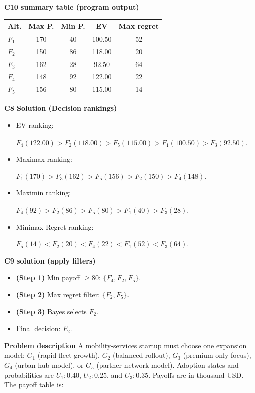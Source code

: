 \begin{ExamProblems}
		\vspace{0.25cm}
		
		\textbf{C10 summary table (program output)}\par
		\begin{center}
			\begin{tabular}{l c c c c}
				\hline
				Alt. & Max P. & Min P. & EV & Max regret \\
				\hline
				$F_1$ & 170 & 40 & 100.50 & 52 \\
				$F_2$ & 150 & 86 & 118.00 & 20 \\
				$F_3$ & 162 & 28 & 92.50 & 64 \\
				$F_4$ & 148 & 92 & 122.00 & 22 \\
				$F_5$ & 156 & 80 & 115.00 & 14 \\
				\hline
			\end{tabular}
		\end{center}
		
		\textbf{C8 Solution (Decision rankings)}\par
		\begin{itemize}
			\item EV ranking: \par $F_4(122.00)>F_2(118.00)>F_5(115.00)>F_1(100.50)>F_3(92.50)$.
			\item Maximax ranking:\par $F_1(170)>F_3(162)>F_5(156)>F_2(150)>F_4(148)$.
			\item Maximin ranking: \par $F_4(92)>F_2(86)>F_5(80)>F_1(40)>F_3(28)$.
			\item Minimax Regret ranking:\par $F_5(14)<F_2(20)<F_4(22)<F_1(52)<F_3(64)$.
		\end{itemize}
		
		\textbf{C9 solution (apply filters)}\par
		\begin{itemize}
			\item \textbf{(Step 1)} Min payoff $\geq 80$: $\{F_4,F_2,F_5\}$.
			\item \textbf{(Step 2)} Max regret filter: $\{F_2,F_5\}$.
			\item \textbf{(Step 3)} Bayes selects $F_2$.
			\item Final decision: $F_2$.
		\end{itemize}
		
		\newpage
		\item
		\textbf{Problem description}
		A mobility-services startup must choose one expansion model: $G_1$ (rapid fleet growth), $G_2$ (balanced rollout), $G_3$ (premium-only focus), $G_4$ (urban hub model), or $G_5$ (partner network model).
		Adoption states and probabilities are $U_1:0.40$, $U_2:0.25$, and $U_3:0.35$. Payoffs are in thousand USD. The payoff table is:
		

\end{ExamProblems}
